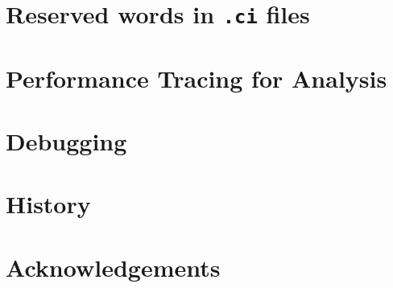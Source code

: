 \documentclass[10pt]{report}
\begin{document}
\chapter{Reserved words in {\tt .ci} files}
\label{sec:keywords}
  

\chapter{Performance Tracing for Analysis}
\label{sec:trace-projections}
  

\chapter{Debugging}
  

\chapter{History}
  

\chapter {Acknowledgements}
  


\end{document}

